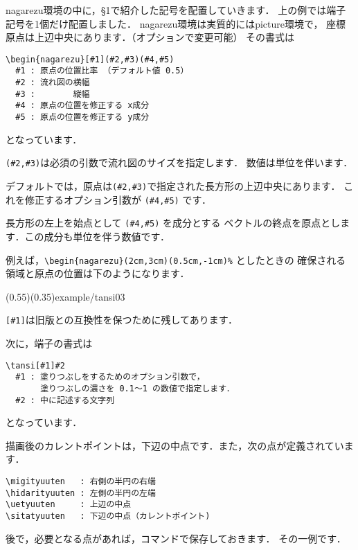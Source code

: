 \documentclass[a4j]{jarticle}
\begin{document}
\textsf{nagarezu}環境の中に，§1で紹介した記号を配置していきます．
上の例では端子記号を1個だけ配置しました．
\textsf{nagarezu}環境は実質的には\textsf{picture}環境で，
座標原点は上辺中央にあります．（オプションで変更可能）
その書式は

\begin{boxnote}
\begin{verbatim}
\begin{nagarezu}[#1](#2,#3)(#4,#5)
  #1 : 原点の位置比率 （デフォルト値 0.5）
  #2 : 流れ図の横幅
  #3 : 　　　　縦幅
  #4 : 原点の位置を修正する x成分
  #5 : 原点の位置を修正する y成分
\end{verbatim}
\end{boxnote}

となっています．

\verb/(#2,#3)/は必須の引数で流れ図のサイズを指定します．
数値は単位を伴います．

デフォルトでは，原点は\verb/(#2,#3)/で指定された長方形の上辺中央にあります．
これを修正するオプション引数が \verb/(#4,#5)/ です．

長方形の左上を始点として \verb/(#4,#5)/ を成分とする
ベクトルの終点を原点とします．この成分も単位を伴う数値です．

例えば，\verb/\begin{nagarezu}(2cm,3cm)(0.5cm,-1cm)%/ としたときの
確保される領域と原点の位置は下のようになります．

(0.55)(0.35){example/tansi03}

\verb/[#1]/は旧版との互換性を保つために残してあります．

次に，端子の書式は

\begin{boxnote}
\begin{verbatim}
\tansi[#1]#2
  #1 : 塗りつぶしをするためのオプション引数で，
       塗りつぶしの濃さを 0.1〜1 の数値で指定します．
  #2 : 中に記述する文字列
\end{verbatim}
\end{boxnote}

となっています．

描画後のカレントポイントは，下辺の中点です．また，次の点が定義されています．
\begin{jquote}
\begin{verbatim}
\migityuuten   : 右側の半円の右端
\hidarityuuten : 左側の半円の左端
\uetyuuten     : 上辺の中点
\sitatyuuten   : 下辺の中点（カレントポイント)
\end{verbatim}
\end{jquote}
後で，必要となる点があれば，コマンドで保存しておきます．
その一例です．
\end{document}
